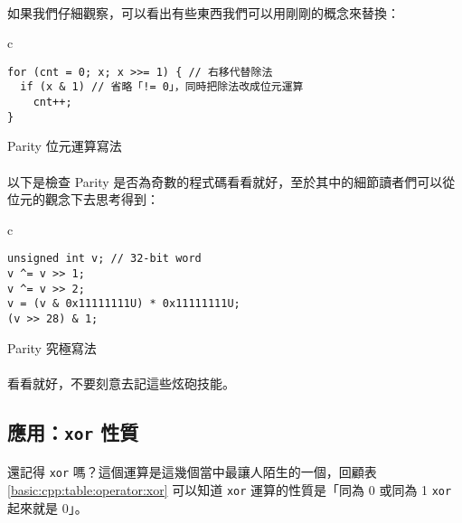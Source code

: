 \documentclass[12pt,a4paper,oneside]{report}
\begin{document}
\begin{CJK}{UTF8}{bkai}
\paragraph{}如果我們仔細觀察，可以看出有些東西我們可以用剛剛的概念來替換：

\begin{code}[h!]
\centering
\begin{tabular}{c}
\begin{lstlisting}
for (cnt = 0; x; x >>= 1) { // 右移代替除法
  if (x & 1) // 省略「!= 0」，同時把除法改成位元運算
    cnt++;
}
\end{lstlisting}
\end{tabular}
\caption{Parity 位元運算寫法}
\label{basic:cpp:code:parity:bitwise}
\end{code}

\paragraph{}以下是檢查 Parity 是否為奇數的程式碼看看就好，至於其中的細節讀者們可以從位元的觀念下去思考得到：

\begin{code}[h!]
\centering
\begin{tabular}{c}
\begin{lstlisting}
unsigned int v; // 32-bit word
v ^= v >> 1;
v ^= v >> 2;
v = (v & 0x11111111U) * 0x11111111U;
(v >> 28) & 1;
\end{lstlisting}
\end{tabular}
\caption{Parity 究極寫法}
\label{basic:cpp:code:parity:power}
\end{code}

\paragraph{}看看就好，不要刻意去記這些炫砲技能。

\subsection{應用：\texttt{xor} 性質}

\paragraph{}還記得 \texttt{xor} 嗎？這個運算是這幾個當中最讓人陌生的一個，回顧表 \ref{basic:cpp:table:operator:xor} 可以知道 \texttt{xor} 運算的性質是「同為 0 或同為 1 \texttt{xor} 起來就是 0」。


\end{CJK}
\end{document}
